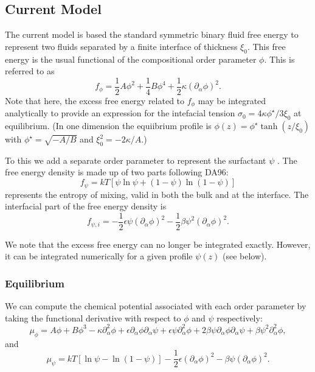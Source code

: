 \subsection{Current Model}

The current model is based the standard symmetric binary fluid
free energy to represent two fluids separated by a finite
interface of thickness $\xi_0$. This free energy is the usual
functional of the compositional order parameter $\phi$. This is
referred to as
\begin{equation}
f_\phi = {\textstyle\frac{1}{2}}A\phi^2
+ {\textstyle\frac{1}{4}}B\phi^4
+ {\textstyle\frac{1}{2}}\kappa (\partial_\alpha \phi)^2.
\end{equation}
Note that here, the excess free energy related to $f_\phi$ may
be integrated analytically to provide an expression for the
intefacial tension $\sigma_0 = 4\kappa\phi^\star/3\xi_0$ at
equilibrium.
(In one dimension the equiibrium profile
is $\phi(z) = \phi^\star \tanh(z/\xi_0)$ with $\phi^\star = \sqrt{-A/B}$
and $\xi_0^2 = -2\kappa/A$.)

To this we add a separate order parameter to represent the
surfactant $\psi$ \cite{vandergraaf}. The free energy density
is made up of two parts following DA96:
\begin{equation}
f_{\psi} = kT[\psi\ln\psi  + (1 - \psi) \ln (1 - \psi)]
\end{equation}
represents the entropy of mixing, valid in both the bulk and at
the interface. The interfacial part of the free energy density is
\begin{equation}
f_{\psi,i} = -{\textstyle\frac{1}{2}}\epsilon\psi (\partial_\alpha \phi)^2
- {\textstyle\frac{1}{2}} \beta \psi^2 (\partial_\alpha \phi)^2.
\end{equation}

We note that the excess free energy can no longer be integrated
exactly. However, it can be integrated numerically for a
given profile $\psi(z)$ (see below).

\subsubsection{Equilibrium}

We can compute the chemical potential associated with each order
parameter by taking the functional derivative with respect to
$\phi$ and $\psi$ respectively:
\begin{equation}
\mu_\phi = A\phi + B\phi^3 - \kappa \partial_\alpha^2 \phi
+ \epsilon \partial_\alpha \phi \partial_\alpha \psi
+ \epsilon \psi \partial_\alpha^2 \phi
+ 2\beta\psi \partial_\alpha \phi \partial_\alpha \psi
+ \beta\psi^2 \partial_\alpha^2 \phi,
\label{eq:mu:phi}
\end{equation}
and
\begin{equation}
\mu_\psi = kT[\ln\psi - \ln(1 - \psi)]
- {\textstyle \frac{1}{2}} \epsilon (\partial_\alpha \phi)^2
- \beta\psi (\partial_\alpha \phi)^2.
\label{eq:mu:psi}
\end{equation}

